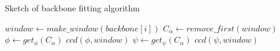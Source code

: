\begin{algorithm}
\caption{Sketch of backbone fitting algorithm}
\label{alg:ccd}
\begin{algorithmic}
			\STATE $window \gets make\_window(backbone[i])$
				\STATE $C_\alpha \gets remove\_first(window)$
				\STATE $\phi \gets get_\phi(C_\alpha)$
				\STATE $ccd(\phi,window)$
				\STATE $\psi \gets get_\psi(C_\alpha)$
				\STATE $ccd(\psi,window)$
			\ENDWHILE
		\ENDFOR
	\ENDFOR
\end{algorithmic}
\end{algorithm}




